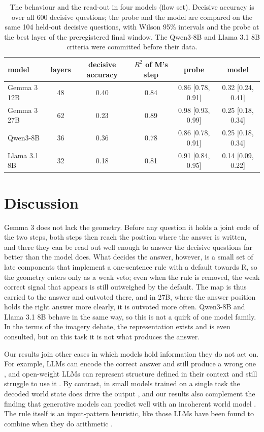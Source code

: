 \documentclass[11pt]{article}
\begin{document}
\begin{table}[t]
  \centering
  \small
  \caption{The behaviour and the read-out in four models (flow set). Decisive accuracy is over all 600 decisive
  questions; the probe and the model are compared on the same 104 held-out decisive questions, with Wilson 95\%
  intervals and the probe at the best layer of the preregistered final window. The Qwen3-8B and Llama 3.1 8B criteria
  were committed before their data.}
  \label{tab:families}
  \begin{tabular}{@{}lccccc@{}}
    \toprule
    model & layers & decisive accuracy & $R^2$ of M's step & probe & model \\
    \midrule
    Gemma 3 12B & 48 & 0.40 & 0.84 & 0.86 [0.78, 0.91] & 0.32 [0.24, 0.41] \\
    Gemma 3 27B & 62 & 0.23 & 0.89 & 0.98 [0.93, 0.99] & 0.25 [0.18, 0.34] \\
    Qwen3-8B & 36 & 0.36 & 0.78 & 0.86 [0.78, 0.91] & 0.25 [0.18, 0.34] \\
    Llama 3.1 8B & 32 & 0.18 & 0.81 & 0.91 [0.84, 0.95] & 0.14 [0.09, 0.22] \\
    \bottomrule
  \end{tabular}
\end{table}

\section{Discussion}
Gemma 3 does not lack the geometry. Before any question it holds a joint code of the two steps, both steps then
reach the position where the answer is written, and there they can be read out well enough to answer the decisive
questions far better than the model does. What decides the answer, however, is a small set of late components that
implement a one-sentence rule with a default towards R, so the geometry enters only as a weak veto; even when the rule
is removed, the weak correct signal that appears is still outweighed by the default. The map is thus carried to the
answer and outvoted there, and in 27B, where the answer position holds the right answer more clearly, it is outvoted
more often. Qwen3-8B and Llama 3.1 8B behave in the same way, so this is not a quirk of one model
family. In the terms of the imagery debate, the representation exists and is even consulted, but on this task it
is not what produces the answer.

Our results join other cases in which models hold information they do not act on. For example, LLMs can encode the correct answer
and still produce a wrong one \citep{orgad2025know}, and open-weight LLMs can represent structure defined in their
context and still struggle to use it \citep{lepori2026incontext}. By contrast, in small models trained on a single
task the decoded world state does drive the output \citep{li2023othello,nanda2023linear}, and our results also
complement the finding that generative models can predict well with an incoherent world model \citep{vafa2024world}.
The rule itself is an input-pattern heuristic, like those LLMs have been found to combine when they do arithmetic
\citep{nikankin2025heuristics}.
\end{document}
